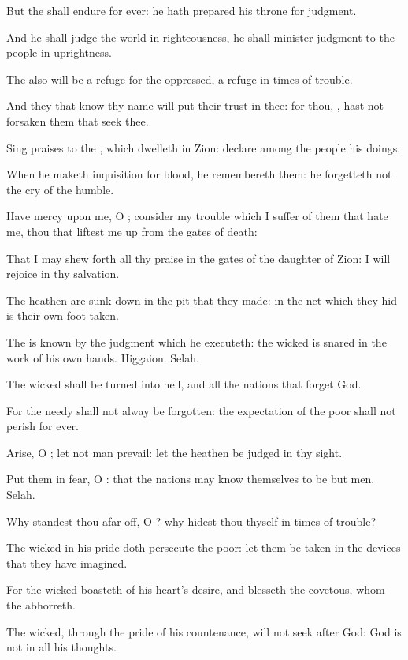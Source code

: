 \Verse But the \LORD shall endure for ever: he hath prepared his throne for judgment.

\Verse And he shall judge the world in righteousness, he shall minister judgment to the people in uprightness.

\Verse The \LORD also will be a refuge for the oppressed, a refuge in times of trouble.

\Verse And they that know thy name will put their trust in thee: for thou, \LORD, hast not forsaken them that seek thee.

\Verse Sing praises to the \LORD, which dwelleth in Zion: declare among the people his doings.

\Verse When he maketh inquisition for blood, he remembereth them: he forgetteth not the cry of the humble.

\Verse Have mercy upon me, O \LORD; consider my trouble which I suffer of them that hate me, thou that liftest me up from the gates of death:

\Verse That I may shew forth all thy praise in the gates of the daughter of Zion: I will rejoice in thy salvation.

\Verse The heathen are sunk down in the pit that they made: in the net which they hid is their own foot taken.

\Verse The \LORD is known by the judgment which he executeth: the wicked is snared in the work of his own hands. Higgaion. Selah.

\Verse The wicked shall be turned into hell, and all the nations that forget God.

\Verse For the needy shall not alway be forgotten: the expectation of the poor shall not perish for ever.

\Verse Arise, O \LORD; let not man prevail: let the heathen be judged in thy sight.

\Verse Put them in fear, O \LORD: that the nations may know themselves to be but men. Selah.




\Chapter
\Verse Why standest thou afar off, O \LORD? why hidest thou thyself in times of trouble?

\Verse The wicked in his pride doth persecute the poor: let them be taken in the devices that they have imagined.

\Verse For the wicked boasteth of his heart's desire, and blesseth the covetous, whom the \LORD abhorreth.

\Verse The wicked, through the pride of his countenance, will not seek after God: God is not in all his thoughts.

